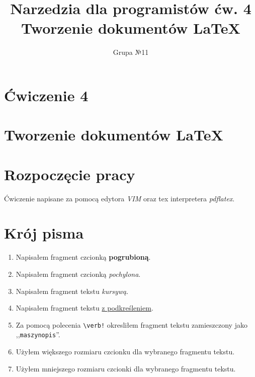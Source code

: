 \documentclass[10pt]{article}
\title{\textbf{Narzedzia dla programistów ćw. 4\\
Tworzenie dokumentów \LaTeX}}
\author{Grupa №11}
\date{}
\begin{document}
\maketitle
\thispagestyle{empty}
\clearpage
\tableofcontents
\listoffigures
\listoftables
\clearpage
\thispagestyle{empty}

\section*{{\huge Ćwiczenie 4}}
\section*{{\huge Tworzenie dokumentów \LaTeX}}
\section{Rozpoczęcie pracy}
Ćwiczenie napisane za pomocą edytora \emph{VIM} oraz tex interpretera \emph{pdflatex}.
\section{Krój pisma}
\begin{enumerate}
\item Napisałem fragment czcionką \textbf{pogrubioną}.
\item Napisałem fragment czcionką \emph{pochylona}.
\item Napisałem fragment tekstu \textit{kursywą}.
\item Napisałem fragment tekstu \underline{z podkreśleniem}.
\item Za pomocą polecenia \verb|\verb!| okresliłem fragment tekstu zamieszczony jako ,,\verb|maszynopis|''.
\item Użyłem większego rozmiaru czcionku dla {\huge wybranego fragmentu tekstu}.
\item Użyłem mniejszego rozmiaru czcionki dla {\footnotesize wybranego fragmentu tekstu}.
\end{enumerate}
\end{document}
